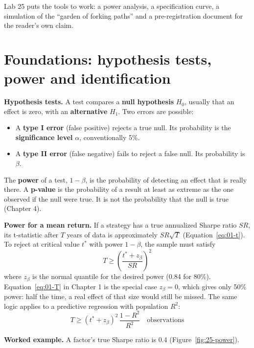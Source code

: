 Lab 25 puts the tools to work: a power analysis, a specification curve, a simulation of the ``garden of forking paths'' and a pre-registration document for the reader's own claim.

\section{Foundations: hypothesis tests, power and identification}
\label{sec:25-foundations}

\textbf{Hypothesis tests.} A test compares a \textbf{null hypothesis} $H_0$, usually that an effect is zero, with an \textbf{alternative} $H_1$. Two errors are possible:

\begin{itemize}
  \item A \textbf{type I error} (false positive) rejects a true null. Its probability is the \textbf{significance level} $\alpha$, conventionally 5\%.
  \item A \textbf{type II error} (false negative) fails to reject a false null. Its probability is $\beta$.
\end{itemize}

The \textbf{power} of a test, $1 - \beta$, is the probability of detecting an effect that is really there. A \textbf{p-value} is the probability of a result at least as extreme as the one observed if the null were true. It is not the probability that the null is true (Chapter 4).

\textbf{Power for a mean return.} If a strategy has a true annualized Sharpe ratio $SR$, its t-statistic after $T$ years of data is approximately $SR\sqrt{T}$ (Equation~\eqref{eq:01-t}). To reject at critical value $t^*$ with power $1 - \beta$, the sample must satisfy
\begin{equation}
  T \geq \left(\frac{t^* + z_\beta}{SR}\right)^2
  \label{eq:25-power}
\end{equation}
where $z_\beta$ is the normal quantile for the desired power (0.84 for 80\%). Equation~\eqref{eq:01-T} in Chapter 1 is the special case $z_\beta = 0$, which gives only 50\% power: half the time, a real effect of that size would still be missed. The same logic applies to a predictive regression with population $R^2$:
\begin{equation}
  T \geq (t^* + z_\beta)^2\,\frac{1 - R^2}{R^2} \quad \text{observations}
  \label{eq:25-power-r2}
\end{equation}

\textbf{Worked example.} A factor's true Sharpe ratio is 0.4 (Figure~\ref{fig:25-power}).

